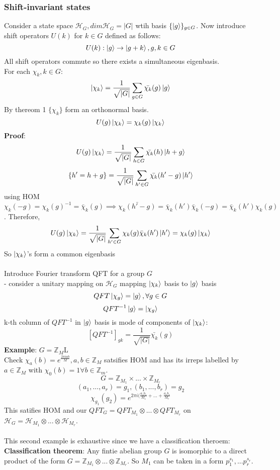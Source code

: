 \documentclass{article}
\begin{document}
\subsubsection{Shift-invariant states}
Consider a state space $\mathcal{H}_G, dim \mathcal{H}_G = |G|$ wtih basis $\{ \ket{g}\}_{g \in G}$. Now introduce shift operators $U(k)$ for $k \in G$ defined as follows:
$$
U(k): \ket{g} \rightarrow \ket{g+k}, g, k \in G
$$
All shift operators commute so there exists a simultaneous eigenbasis.\\
For each $\chi_k, k \in G$:
$$
\ket{\chi_k} = \frac{1}{\sqrt{|G|}} \sum_{g \in G} \bar{\chi_k} (g) \ket{g}
$$
By thereom 1 $\{ \chi_k \}$ form an orthonormal basis.
$$
U(g) \ket{\chi_k} = \chi_k(g) \ket{\chi_k}
$$
\textbf{Proof}:$$U(g) \ket{\chi_k} = \frac{1}{\sqrt{|G|}} \sum_{h \in G} \bar{\chi_k} (h) \ket{h + g}$$
        $$
        \{h' = h+ g\} = \frac{1}{\sqrt{|G|}} \sum_{h' \in G} \bar{\chi_k} (h' - g) \ket{h'}
        $$
        using HOM $\chi_k(-g) = \chi_k(g)^{-1} = \bar \chi_k(g) \implies \bar{\chi_k(h'-g)} = \bar \chi_k(h') \bar \chi_k(-g) = \bar \chi_k(h') \chi_k(g)$. Therefore,
        $$
        U(g) \ket{\chi_k} = \frac{1}{\sqrt{|G|}}\sum_{h' \in G} \chi_k(g) \bar \chi_k(h') \ket{h'} = \chi_k(g) \ket{\chi_k}
        $$
        So $\ket{\chi_k}$'s form a common eigenbasis\\\\
        Introduce Fourier transform QFT for a group $G$\\
- consider a unitary mapping on $\mathcal{H}_G$ mapping $\ket{\chi_k}$ basis to $\ket{g}$ basis
$$
QFT \ket{\chi_g} = \ket{g}, \forall g \in G
$$
$$
QFT^{-1} \ket{g} =  \ket{\chi_g}
$$
k-th column of $QFT^{-1}$ in $\ket{g}$ basis is mode of components of $\ket{\chi_k}$:
        $$
        [QFT^{-1}]_{gk} = \frac{1}{\sqrt{|G|}} \bar{\chi_k}(g)
        $$
        \textbf{Example}: $G = \mathbb{Z}_M$L\\
        Check $\chi_a(b) = e^{\frac{2\pi i a b}{M}}, a, b \in \mathbb{Z}_M$ satsifies HOM and has its irreps labelled by $a \in \mathbb{Z}_M$ with $\chi_0(b) = 1 \forall b \in \mathbb{Z}_m$.
        $$
        G = \mathbb{Z}_{M_1} \times ... \times \mathbb{Z}_{M_r}
        $$
        $$
        (a_1, ..., a_r ) = g_1, (b_1, ..., b_r) = g_2
        $$
        $$
        \chi_{g_1} (g_2) = e^{2\pi i ( \frac{a_1 b_1}{M_1} +... + \frac{a_r b_r}{M_r}}
        $$
This satifies HOM and our $QFT_G = QFT_{M_1} \otimes ... \otimes QFT_{M_r}$ on $\mathcal{H}_G = \mathcal{H}_{M_1} \otimes ... \otimes \mathcal{H}_{M_r}$.\\\\
This second example is exhaustive since we have a classification theroem:\\
\textbf{Classification theorem}: Any fintie abelian group $G$ is isomorphic to a direct product of the form $G = \mathbb{Z}_{M_1} \otimes ... \otimes \mathbb{Z}_{M_r}$. So $M_1$ can be taken in a form $p_1^{s_1},... p_r^{s_r}$.
\end{document}
